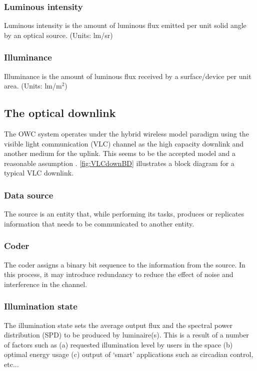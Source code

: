 \subsubsection{Luminous intensity}
\label{subsubsec:luminousIntensity}
Luminous intensity is the amount of luminous flux emitted per unit solid angle by an optical source. (Units: lm/sr)

\subsubsection{Illuminance}
\label{subsubsec:illuminance}
Illuminance is the amount of luminous flux received by a surface/device per unit area. (Units: lm/m$^{2}$)


\subsection{The optical downlink}
\label{subsec:outlineDownlink}

The OWC system operates under the hybrid wireless model paradigm using the visible light communication (VLC) channel as the high capacity downlink and another medium for the uplink. This seems to be the accepted model and a reasonable assumption \cite{rah15a}. \figurename{ \ref{fig:VLCdownBD}} illustrates a block diagram for a typical VLC downlink. 

\subsubsection{Data source}
\label{subsubsec:outlineSource}
The source is an entity that, while performing its tasks, produces or replicates information that needs to be communicated to another entity. 

\subsubsection{Coder}
\label{subsubsec:outlineCoder}
The coder assigns a binary bit sequence to the information from the source. In this process, it may introduce redundancy to reduce the effect of noise and interference in the channel. 

\subsubsection{Illumination state}
\label{subsubsec:outlineIllumination}
The illumination state sets the average output flux and the spectral power distribution (SPD) to be produced by luminaire(s). This is a result of a number of factors such as (a) requested illumination level by users in the space (b) optimal energy usage (c) output of `smart' applications such as circadian control, etc...

